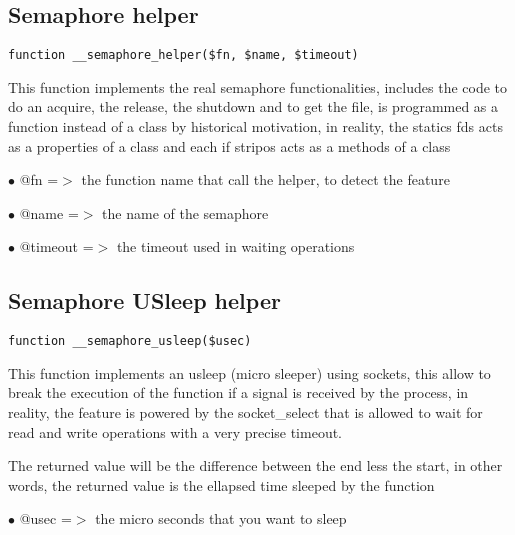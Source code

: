 \documentclass[a4paper]{book}
\begin{document}
\hypertarget{toc221}{}
\subsection{Semaphore helper}

\begin{lstlisting}
function __semaphore_helper($fn, $name, $timeout)
\end{lstlisting}

This function implements the real semaphore functionalities, includes
the code to do an acquire, the release, the shutdown and to get the
file, is programmed as a function instead of a class by historical
motivation, in reality, the statics fds acts as a properties of a
class and each if stripos acts as a methods of a class

\begin{compactitem}
\item[\color{myblue}$\bullet$] @fn      =$>$ the function name that call the helper, to detect the feature
\item[\color{myblue}$\bullet$] @name    =$>$ the name of the semaphore
\item[\color{myblue}$\bullet$] @timeout =$>$ the timeout used in waiting operations
\end{compactitem}

\hypertarget{toc222}{}
\subsection{Semaphore USleep helper}

\begin{lstlisting}
function __semaphore_usleep($usec)
\end{lstlisting}

This function implements an usleep (micro sleeper) using sockets, this
allow to break the execution of the function if a signal is received by
the process, in reality, the feature is powered by the socket\_select that
is allowed to wait for read and write operations with a very precise
timeout.

The returned value will be the difference between the end less the start,
in other words, the returned value is the ellapsed time sleeped by the
function

\begin{compactitem}
\item[\color{myblue}$\bullet$] @usec =$>$ the micro seconds that you want to sleep
\end{compactitem}
\end{document}
